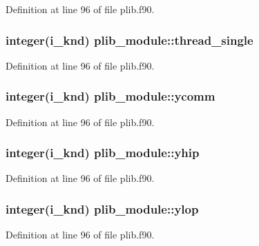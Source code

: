Definition at line 96 of file plib.\-f90.

\hypertarget{classplib__module_a976973aed6846d0da2cc7fc29e0f0097}{
\subsubsection[{thread\-\_\-single}]{\setlength{\rightskip}{0pt plus 5cm}integer(i\-\_\-knd) plib\-\_\-module\-::thread\-\_\-single}}\label{classplib__module_a976973aed6846d0da2cc7fc29e0f0097}


Definition at line 96 of file plib.\-f90.

\hypertarget{classplib__module_af98dd05eb9d15041b5c783c6be090495}{
\subsubsection[{ycomm}]{\setlength{\rightskip}{0pt plus 5cm}integer(i\-\_\-knd) plib\-\_\-module\-::ycomm}}\label{classplib__module_af98dd05eb9d15041b5c783c6be090495}


Definition at line 96 of file plib.\-f90.

\hypertarget{classplib__module_a5520d897cd8da06d1815c1ec27010cf3}{
\subsubsection[{yhip}]{\setlength{\rightskip}{0pt plus 5cm}integer(i\-\_\-knd) plib\-\_\-module\-::yhip}}\label{classplib__module_a5520d897cd8da06d1815c1ec27010cf3}


Definition at line 96 of file plib.\-f90.

\hypertarget{classplib__module_a95589a7523a49a05f8af1b39f7e75df8}{
\subsubsection[{ylop}]{\setlength{\rightskip}{0pt plus 5cm}integer(i\-\_\-knd) plib\-\_\-module\-::ylop}}\label{classplib__module_a95589a7523a49a05f8af1b39f7e75df8}


Definition at line 96 of file plib.\-f90.

